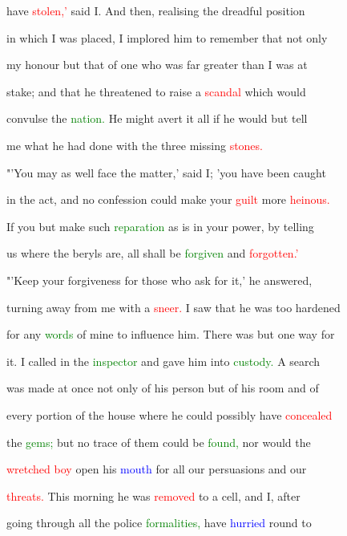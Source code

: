  have \textcolor{red}{stolen,'} said I. And then, realising the \textcolor{BurntOrange}{dreadful} position

 in which I was placed, I implored him to remember that not only

 my honour but that of one who was far greater than I was at

 stake; and that he \textcolor{BurntOrange}{threatened} to raise a \textcolor{red}{scandal} which would

 convulse the \textcolor{green}{nation.} He might avert it all if he would but tell

 me what he had done with the three missing \textcolor{red}{stones.}



 "'You may as well face the matter,' said I; 'you have been caught

 in the act, and no \textcolor{BurntOrange}{confession} could make your \textcolor{red}{guilt} more \textcolor{red}{heinous.}

 If you but make such \textcolor{green}{reparation} as is in your power, by telling

 us where the beryls are, all shall be \textcolor{green}{forgiven} and \textcolor{red}{forgotten.'}



 "'Keep your forgiveness for those who ask for it,' he answered,

 turning away from me with a \textcolor{red}{sneer.} I saw that he was too hardened

 for any \textcolor{green}{words} of mine to \textcolor{BurntOrange}{influence} him. There was but one way for

 it. I called in the \textcolor{green}{inspector} and gave him into \textcolor{green}{custody.} A search

 was made at once not only of his person but of his room and of

 every portion of the house where he could possibly have \textcolor{red}{concealed}

 the \textcolor{green}{gems;} but no trace of them could be \textcolor{green}{found,} nor would the

 \textcolor{red}{wretched} \textcolor{red}{boy} open his \textcolor{blue}{mouth} for all our persuasions and our

 \textcolor{red}{threats.} This morning he was \textcolor{red}{removed} to a cell, and I, after

 going through all the \textcolor{BurntOrange}{police} \textcolor{green}{formalities,} have \textcolor{blue}{hurried} round to

